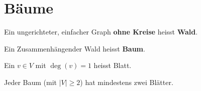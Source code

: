 \section{Bäume}
\begin{def*}[note = Wald , index = Wald]
	Ein ungerichteter, einfacher Graph \textbf{ohne Kreise} heisst \textbf{Wald}.
\end{def*}
\begin{def*}[note = Baum , index = Baum]
	Ein Zusammenhängender Wald heisst \textbf{Baum}.
\end{def*}
\begin{def*}[note = Blatt , index = Blatt]
	Ein $v \in V$ mit $\deg(v) = 1$ heisst Blatt.
\end{def*}
\begin{satz*}
	Jeder Baum (mit $|V| \geq 2$) hat mindestens zwei Blätter.
\end{satz*}

